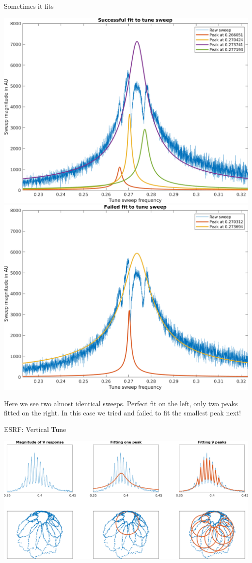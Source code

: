 \documentclass[aspectratio=169, xcolor=table]{beamer}
\begin{document}
%
\begin{frame}{Sometimes it fits}

\includegraphics[width=0.45\linewidth]{hard-fit-ok.png}
\includegraphics[width=0.45\linewidth]{hard-fit-fail.png}

Here we see two almost identical sweeps.  Perfect fit on the left, only two
peaks fitted on the right.  In this case we tried and failed to fit the smallest
peak next!

\end{frame}


%
\begin{frame}{ESRF: Vertical Tune}

\includegraphics[width=\linewidth]{esrf-V.png}

\end{frame}
\end{document}
